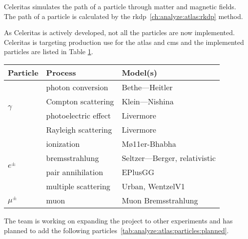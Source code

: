 Celeritas simulates the path of a particle through matter and magnetic fields.
The path of a particle is calculated by the \acrshort{rkdp}~\ref{ch:analyze:atlas:rkdp} method.

As Celeritas is actively developed, not all the particles are now implemented.
Celeritas is targeting production use for the \acrshort{atlas} and \acrshort{cms}
 and the implemented particles are listed in Table \ref{tab:analyze:atlas:particles:implemented}.

\begin{table}[ht]
    \centering
    \begin{tabular}{lll}
        \hline
        \textbf{Particle}         & \textbf{Process}     & \textbf{Model(s)}            \\
        \hline
        \multirow{4}{*}{$\gamma$} & photon conversion    & Bethe—Heitler                \\
                                  & Compton scattering   & Klein—Nishina                \\
                                  & photoelectric effect & Livermore                    \\
                                  & Rayleigh scattering  & Livermore                    \\
        \hline
        \multirow{4}{*}{$e^\pm$}  & ionization           & Mø11er-Bhabha                \\
                                  & bremsstrahlung       & Seltzer—Berger, relativistic \\
                                  & pair annihilation    & EPlusGG                      \\
                                  & multiple scattering  & Urban, WentzelV1             \\
        \hline
        $\mu^\pm$                 & muon                 & Muon Bremsstrahlung          \\
        \hline
    \end{tabular}
    \label{tab:analyze:atlas:particles:implemented}
\end{table}

The team is working on expanding the project to other experiments and has planned
to add the following particles~\ref{tab:analyze:atlas:particles:planned}.

